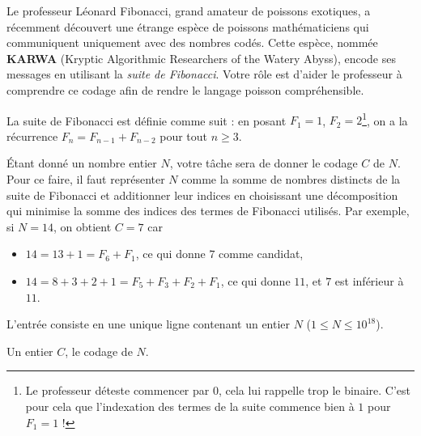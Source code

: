 \problemname{\problemyamlname{}}


Le professeur Léonard Fibonacci, grand amateur de poissons exotiques, a récemment découvert une étrange espèce de poissons mathématiciens qui communiquent uniquement avec des nombres codés. Cette espèce, nommée \textbf{KARWA} (Kryptic Algorithmic Researchers of the Watery Abyss), encode ses messages en utilisant la \textit{suite de Fibonacci}. Votre rôle est d'aider le professeur à comprendre ce codage afin de rendre le langage poisson compréhensible.

La suite de Fibonacci est définie comme suit : en posant $F_1 = 1$, $F_2 = 2$\footnote{Le professeur déteste commencer par $0$, cela lui rappelle trop le binaire. C'est pour cela que l'indexation des termes de la suite commence bien à $1$ pour $F_1 = 1$ !}, on a la récurrence $F_n = F_{n-1} + F_{n-2}$ pour tout $n \geq 3$.

Étant donné un nombre entier $N$, votre tâche sera de donner le codage $C$ de $N$. Pour ce faire, il faut représenter $N$ comme la somme de nombres distincts de la suite de Fibonacci et additionner leur indices en choisissant une décomposition qui minimise la somme des indices des termes de Fibonacci utilisés. Par exemple, si $N = 14$, on obtient $C = 7$ car
\begin{itemize}
    \item $14 = 13 + 1 = F_6 + F_1$, ce qui donne $7$ comme candidat,
    \item $14 = 8 + 3 + 2 + 1 = F_5 + F_3 + F_2 + F_1$, ce qui donne $11$, et $7$ est inférieur à $11$.
\end{itemize}

\begin{Input}
    L'entrée consiste en une unique ligne contenant un entier $N$ ($1 \leq N \leq 10^{18}$).
\end{Input}

\begin{Output}
    Un entier $C$, le codage de $N$.
\end{Output}
